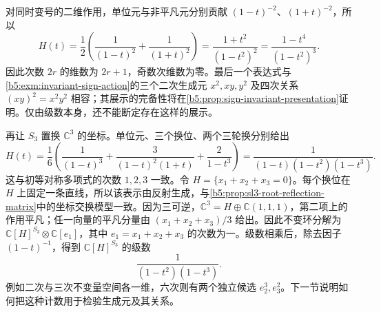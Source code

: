 \begin{example}\label{b5:exm:molien-sign-plane}
	对同时变号的二维作用，单位元与非平凡元分别贡献 \((1-t)^{-2}\)、\((1+t)^{-2}\)，所以
	\[
		H(t)=\frac12\left(\frac1{(1-t)^2}+\frac1{(1+t)^2}\right) =\frac{1+t^2}{(1-t^2)^2} =\frac{1-t^4}{(1-t^2)^3}.
	\]
	因此次数 \(2r\) 的维数为 \(2r+1\)，奇数次维数为零。最后一个表达式与\cref{b5:exm:invariant-sign-action}的三个二次生成元 \(x^2,xy,y^2\) 及四次关系 \((xy)^2=x^2y^2\) 相容；其展示的完备性将在\cref{b5:prop:sign-invariant-presentation}证明。仅由级数本身，还不能断定存在这样的展示。
\end{example}

再让 \(S_3\) 置换 \(\mathbb C^3\) 的坐标。单位元、三个换位、两个三轮换分别给出
\[
	H(t)=\frac16\left( \frac1{(1-t)^3} +\frac3{(1-t)^2(1+t)} +\frac2{1-t^3} \right) =\frac1{(1-t)(1-t^2)(1-t^3)}.
\]
这与初等对称多项式的次数 \(1,2,3\) 一致。令 \(H=\{x_1+x_2+x_3=0\}\)。每个换位在 \(H\) 上固定一条直线，所以该表示由反射生成，与\cref{b5:prop:sl3-root-reflection-matrix}中的坐标交换模型一致。因为三可逆，\(\mathbb C^3=H\oplus\mathbb C(1,1,1)\)，第二项上的作用平凡；任一向量的平凡分量由 \((x_1+x_2+x_3)/3\) 给出。因此不变环分解为 \(\mathbb C[H]^{S_3}\otimes\mathbb C[e_1]\)，其中 \(e_1=x_1+x_2+x_3\) 的次数为一。级数相乘后，除去因子 \((1-t)^{-1}\)，得到 \(\mathbb C[H]^{S_3}\) 的级数
\[
	\frac1{(1-t^2)(1-t^3)}.
\]
例如二次与三次不变量空间各一维，六次则有两个独立候选 \(e_2^3,e_3^2\)。下一节说明如何把这种计数用于检验生成元及其关系。
